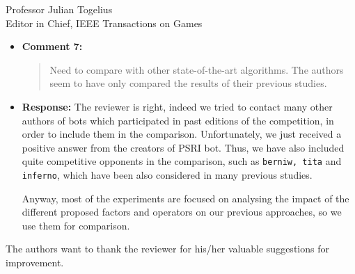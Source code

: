 \documentclass[10pt]{letter} %
\begin{document}
\begin{letter}{Professor Julian Togelius \\ Editor in Chief, IEEE Transactions on Games}
\begin{enumerate}
\begin{itemize}
		\item {\bf Comment 7:}
		\begin{quote}
Need to compare with other state-of-the-art algorithms. The authors seem to have only compared the results of their previous studies.				
			\end{quote}	
		\item {\bf Response:} 
		The reviewer is right, indeed we tried to contact many other authors of bots which participated in past editions of the competition, in order to include them in the comparison. Unfortunately, we just received a positive answer from the creators of PSRI bot. Thus, we have also included quite competitive opponents in the comparison, such as \texttt{berniw, tita} and \texttt{inferno}, which have been also considered in many previous studies.

Anyway, most of the experiments are focused on analysing the impact of
the different proposed factors and operators on our previous
approaches, so we use them for comparison.
		
	\end{itemize}

The authors want to thank the reviewer for his/her valuable suggestions for improvement.


\end{enumerate}
 


\end{letter}
\end{document}

